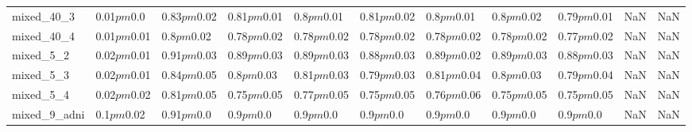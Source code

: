 \begin{tabular}{lllllllllll}
mixed_40_3 & 0.01$pm$0.0 & 0.83$pm$0.02 & 0.81$pm$0.01 & 0.8$pm$0.01 & 0.81$pm$0.02 & 0.8$pm$0.01 & 0.8$pm$0.02 & 0.79$pm$0.01 & NaN & NaN \\
mixed_40_4 & 0.01$pm$0.01 & 0.8$pm$0.02 & 0.78$pm$0.02 & 0.78$pm$0.02 & 0.78$pm$0.02 & 0.78$pm$0.02 & 0.78$pm$0.02 & 0.77$pm$0.02 & NaN & NaN \\
mixed_5_2 & 0.02$pm$0.01 & 0.91$pm$0.03 & 0.89$pm$0.03 & 0.89$pm$0.03 & 0.88$pm$0.03 & 0.89$pm$0.02 & 0.89$pm$0.03 & 0.88$pm$0.03 & NaN & NaN \\
mixed_5_3 & 0.02$pm$0.01 & 0.84$pm$0.05 & 0.8$pm$0.03 & 0.81$pm$0.03 & 0.79$pm$0.03 & 0.81$pm$0.04 & 0.8$pm$0.03 & 0.79$pm$0.04 & NaN & NaN \\
mixed_5_4 & 0.02$pm$0.02 & 0.81$pm$0.05 & 0.75$pm$0.05 & 0.77$pm$0.05 & 0.75$pm$0.05 & 0.76$pm$0.06 & 0.75$pm$0.05 & 0.75$pm$0.05 & NaN & NaN \\
mixed_9_adni & 0.1$pm$0.02 & 0.91$pm$0.0 & 0.9$pm$0.0 & 0.9$pm$0.0 & 0.9$pm$0.0 & 0.9$pm$0.0 & 0.9$pm$0.0 & 0.9$pm$0.0 & NaN & NaN \\
\bottomrule
\end{tabular}
